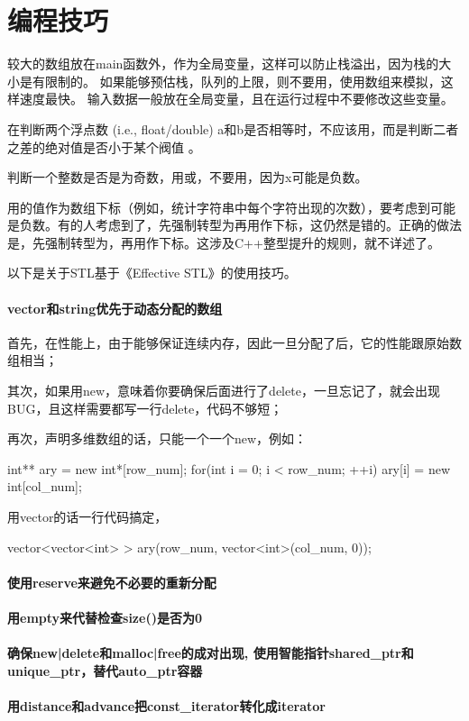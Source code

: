 \chapter{编程技巧}
较大的数组放在main函数外，作为全局变量，这样可以防止栈溢出，因为栈的大小是有限制的。
如果能够预估栈，队列的上限，则不要用，使用数组来模拟，这样速度最快。
输入数据一般放在全局变量，且在运行过程中不要修改这些变量。


在判断两个浮点数 (i.e., 
float/double) 
a和b是否相等时，不应该用，而是判断二者之差的绝对值是否小于某个阀值 
。

判断一个整数是否是为奇数，用或，不要用，因为x可能是负数。

用的值作为数组下标（例如，统计字符串中每个字符出现的次数），要考虑到可能是负数。有的人考虑到了，先强制转型为再用作下标，这仍然是错的。正确的做法是，先强制转型为，再用作下标。这涉及C++整型提升的规则，就不详述了。

以下是关于STL基于《Effective STL》的使用技巧。

\subsubsection{vector和string优先于动态分配的数组}
首先，在性能上，由于能够保证连续内存，因此一旦分配了后，它的性能跟原始数组相当；

其次，如果用new，意味着你要确保后面进行了delete，一旦忘记了，就会出现BUG，且这样需要都写一行delete，代码不够短；

再次，声明多维数组的话，只能一个一个new，例如：
\begin{Code}
	int** ary = new int*[row_num];
	for(int i = 0; i < row_num; ++i)
		ary[i] = new int[col_num];
\end{Code}

用vector的话一行代码搞定，
\begin{Code}
	vector<vector<int> > ary(row_num, vector<int>(col_num, 0));
\end{Code}

\subsubsection{使用reserve来避免不必要的重新分配}
\subsubsection{用empty来代替检查size()是否为0}
\subsubsection{确保new|delete和malloc|free的成对出现, 
使用智能指针shared_ptr和unique_ptr，替代auto_ptr容器}
\subsubsection{用distance和advance把const_iterator转化成iterator}